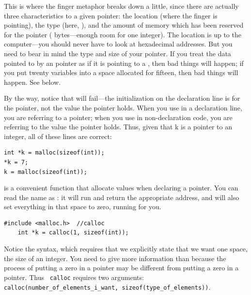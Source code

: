 \index{\&}

This is where the finger metaphor breaks down a little, since there are actually three characteristics
to a given pointer: the location (where the finger is pointing), the type (here, ), and the
amount of memory which has been reserved for the pointer ( bytes---enough room for one
integer). The location is up to the computer---you should never have
to look at hexadecimal addresses. But you need to bear in mind the type
and size of your pointer. If you treat the data pointed to by an  pointer as if it is pointing to a , then bad things will
happen; if you put twenty variables into a space allocated for fifteen,
then bad things will happen. See below.

By the way, notice that  will fail---the initialization
on the declaration line is for the pointer, not the value the pointer
holds. When you use  in a declaration line, you are referring to
a pointer; when you use  in non-declaration code, you are
referring to the value the pointer holds.
Thus, given that k is a pointer to an integer, all of
these lines are correct:
\begin{lstlisting}
int *k = malloc(sizeof(int));
*k = 7;
k = malloc(sizeof(int)); 
\end{lstlisting}

 is a convenient function that allocate values when declaring a pointer.
You can read the name as : it will run 
and return the appropriate address, and will also set everything in
that space to zero, running  for you.
\begin{lstlisting}
#include <malloc.h>  //calloc
    int *k = calloc(1, sizeof(int));
\end{lstlisting}
Notice the syntax,
which requires that we explicitly state that we want one space, the
size of an integer. You need to give more information than 
because the process of putting a zero in a  pointer may be
different from putting a zero in a  pointer. Thus {\tt
calloc} requires two arguments: {\tt
calloc(number\_of\_elements\_i\_want, sizeof(type\_of\_elements))}.

